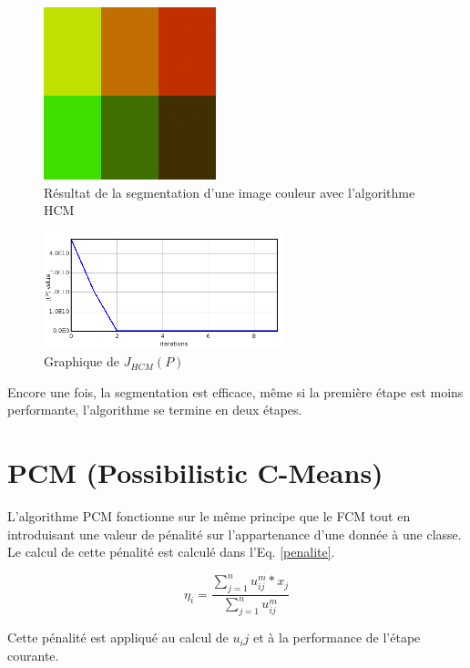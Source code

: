 \documentclass[a4paper,11pt]{article}
\begin{document}
\begin{figure}[!h]
  \begin{center}
    \includegraphics[width=5cm]{resultat/HCM.png}
    \caption{Résultat de la segmentation d'une image couleur avec l'algorithme HCM}
    \label{fig:hcm}
  \end{center}
\end{figure}

\begin{figure}[!h]
  \begin{center}
    \includegraphics[width=7cm]{resultat/HCM_graph.png}
    \caption{Graphique de $J_{HCM}(P)$}
    \label{fig:graphHCM}
  \end{center}
\end{figure}

Encore une fois, la segmentation est efficace, même si la première étape est moins performante, l'algorithme
se termine en deux étapes.
\newpage
\section{PCM (Possibilistic C-Means)}
L'algorithme PCM fonctionne sur le même principe que le FCM tout en introduisant une valeur de pénalité
sur l'appartenance d'une donnée à une classe. Le calcul de cette pénalité est calculé dans l'Eq. \ref{penalite}.

\begin{equation}
  \label{penalite}
  \eta_i = \frac{\sum_{j=1}^{n} u_{ij}^m * x_j}{\sum_{j=1}^{n} u_{ij}^m}
\end{equation}

Cette pénalité est appliqué au calcul de $u_ij$ et à la performance de l'étape courante.
\end{document}
